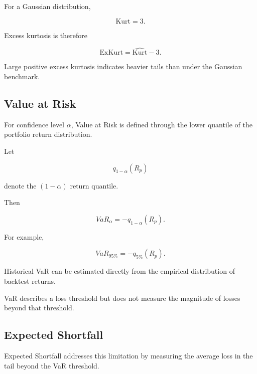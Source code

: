 \documentclass[11pt,a4paper]{article}
\begin{document}
For a Gaussian distribution,

\begin{equation}
\mathrm{Kurt}=3.
\end{equation}

Excess kurtosis is therefore

\begin{equation}
\boxed{
\mathrm{ExKurt}
=
\widehat{\mathrm{Kurt}}-3.
}
\end{equation}

Large positive excess kurtosis indicates heavier tails than under the Gaussian
benchmark.


\subsection{Value at Risk}

For confidence level $\alpha$, Value at Risk is defined through the lower
quantile of the portfolio return distribution.

Let

\begin{equation}
q_{1-\alpha}(R_p)
\end{equation}

denote the $(1-\alpha)$ return quantile.

Then

\begin{equation}
\boxed{
VaR_{\alpha}
=
-
q_{1-\alpha}(R_p).
}
\end{equation}

For example,

\begin{equation}
VaR_{95\%}
=
-
q_{5\%}(R_p).
\end{equation}

Historical VaR can be estimated directly from the empirical distribution of
backtest returns.

VaR describes a loss threshold but does not measure the magnitude of losses
beyond that threshold.


\subsection{Expected Shortfall}

Expected Shortfall addresses this limitation by measuring the average loss in
the tail beyond the VaR threshold.
\end{document}
